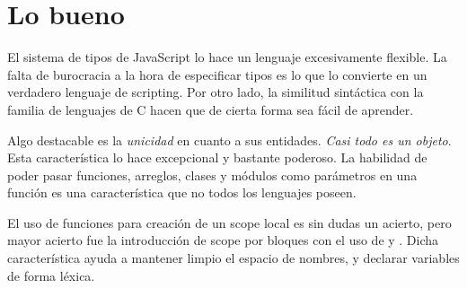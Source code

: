 \section*{Lo bueno}

El sistema de tipos de JavaScript lo hace un lenguaje excesivamente flexible. La falta de burocracia a la hora de especificar tipos es lo que lo convierte en un verdadero lenguaje de scripting. Por otro lado, la similitud sintáctica con la familia de lenguajes de C hacen que de cierta forma sea fácil de aprender. 

Algo destacable es la \textit{unicidad} en cuanto a sus entidades. \textit{Casi todo es un objeto}. Esta característica lo hace excepcional y bastante poderoso. La habilidad de poder pasar funciones, arreglos, clases y módulos como parámetros en una función es una característica que no todos los lenguajes poseen.

El uso de funciones para creación de un scope local es sin dudas un acierto, pero mayor acierto fue la introducción de scope por bloques con el uso de  y . Dicha característica ayuda a mantener limpio el espacio de nombres, y declarar variables de forma léxica.